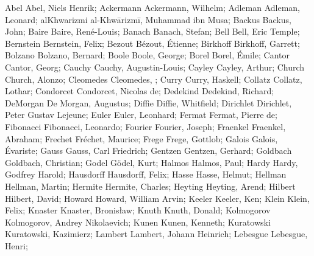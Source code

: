 \DefFriend Abel             Abel, Niels Henrik;
\DefFriend Ackermann        Ackermann, Wilhelm;
\DefFriend Adleman          Adleman, Leonard;
\DefFriend alKhwarizmi      al-Khwārizmī, Muhammad ibn Musa;
\DefFriend Backus           Backus, John;
\DefFriend Baire            Baire, René-Louis;
\DefFriend Banach           Banach, Stefan;
\DefFriend Bell             Bell, Eric Temple;
\DefFriend Bernstein        Bernstein, Felix;
\DefFriend Bezout           Bézout, Étienne;
\DefFriend Birkhoff         Birkhoff, Garrett;
\DefFriend Bolzano          Bolzano, Bernard;
\DefFriend Boole            Boole, George;
\DefFriend Borel            Borel, Émile;
\DefFriend Cantor           Cantor, Georg;
\DefFriend Cauchy           Cauchy, Augustin-Louis;
\DefFriend Cayley           Cayley, Arthur;
\DefFriend Church           Church, Alonzo;
\DefFriend Cleomedes        Cleomedes, ; %
\DefFriend Curry            Curry, Haskell;
\DefFriend Collatz          Collatz, Lothar;
\DefFriend Condorcet        Condorcet, Nicolas de;
\DefFriend Dedekind         Dedekind, Richard;
\DefFriend DeMorgan         De Morgan, Augustus;
\DefFriend Diffie           Diffie, Whitfield;
\DefFriend Dirichlet        Dirichlet, Peter Gustav Lejeune;
\DefFriend Euler            Euler, Leonhard;
\DefFriend Fermat           Fermat, Pierre de;
\DefFriend Fibonacci        Fibonacci, Leonardo;
\DefFriend Fourier          Fourier, Joseph;
\DefFriend Fraenkel         Fraenkel, Abraham;
\DefFriend Frechet          Fréchet, Maurice;
\DefFriend Frege            Frege, Gottlob;
\DefFriend Galois           Galois, Évariste;
\DefFriend Gauss            Gauss, Carl Friedrich;
\DefFriend Gentzen          Gentzen, Gerhard;
\DefFriend Goldbach         Goldbach, Christian;
\DefFriend Godel            Gödel, Kurt;
\DefFriend Halmos           Halmos, Paul;
\DefFriend Hardy            Hardy, Godfrey Harold;
\DefFriend Hausdorff        Hausdorff, Felix;
\DefFriend Hasse            Hasse, Helmut;
\DefFriend Hellman          Hellman, Martin;
\DefFriend Hermite          Hermite, Charles;
\DefFriend Heyting          Heyting, Arend;
\DefFriend Hilbert          Hilbert, David;
\DefFriend Howard           Howard, William Arvin;
\DefFriend Keeler           Keeler, Ken;
\DefFriend Klein            Klein, Felix;
\DefFriend Knaster          Knaster, Bronisław;
\DefFriend Knuth            Knuth, Donald;
\DefFriend Kolmogorov       Kolmogorov, Andrey Nikolaevich;
\DefFriend Kunen            Kunen, Kenneth;
\DefFriend Kuratowski       Kuratowski, Kazimierz;
\DefFriend Lambert          Lambert, Johann Heinrich;
\DefFriend Lebesgue         Lebesgue, Henri;

